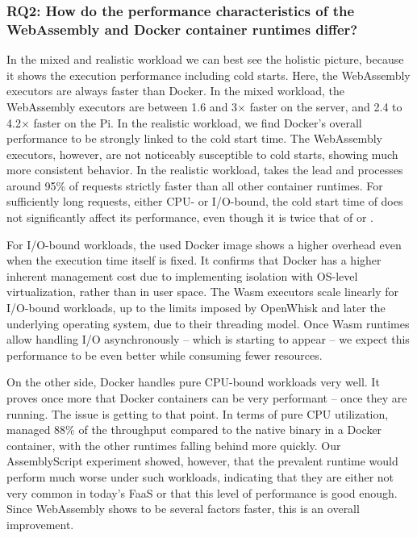 \subsubsection*{RQ2: How do the performance characteristics of the WebAssembly and Docker container runtimes differ?}

In the mixed and realistic workload we can best see the holistic picture, because it shows the execution performance including cold starts. Here, the WebAssembly executors are always faster than Docker. In the mixed workload, the WebAssembly executors are between 1.6 and 3$\times$ faster on the server, and 2.4 to 4.2$\times$ faster on the Pi. In the realistic workload, we find Docker's overall performance to be strongly linked to the cold start time. The WebAssembly executors, however, are not noticeably susceptible to cold starts, showing much more consistent behavior. In the realistic workload,  takes the lead and processes around 95\% of requests strictly faster than all other container runtimes. For sufficiently long requests, either CPU- or I/O-bound, the cold start time of  does not significantly affect its performance, even though it is twice that of  or .

For I/O-bound workloads, the used Docker image shows a higher overhead even when the execution time itself is fixed. It confirms that Docker has a higher inherent management cost due to implementing isolation with OS-level virtualization, rather than in user space.
The Wasm executors scale linearly for I/O-bound workloads, up to the limits imposed by OpenWhisk and later the underlying operating system, due to their threading model. Once Wasm runtimes allow handling I/O asynchronously -- which is starting to appear -- we expect this performance to be even better while consuming fewer resources.

On the other side, Docker handles pure CPU-bound workloads very well. It proves once more that Docker containers can be very performant -- once they are running. The issue is getting to that point.
In terms of pure CPU utilization,  managed 88\% of the throughput compared to the native binary in a Docker container, with the other runtimes falling behind more quickly. Our AssemblyScript experiment showed, however, that the prevalent  runtime would perform much worse under such workloads, indicating that they are either not very common in today's FaaS or that this level of performance is good enough. Since WebAssembly shows to be several factors faster, this is an overall improvement.

